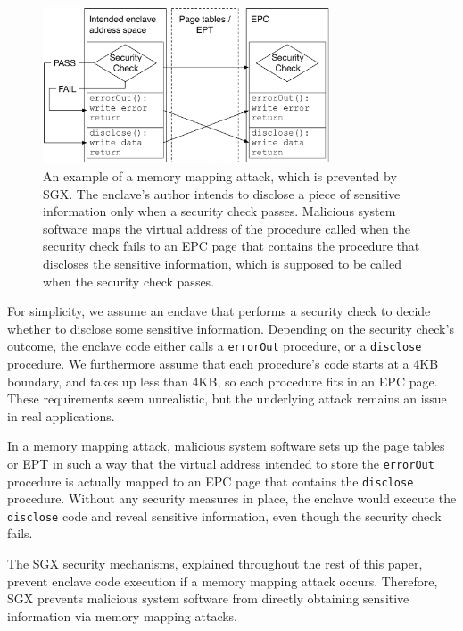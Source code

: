 \begin{figure}[hbt]
  \centering
  \includegraphics[width=85mm]{figures/sgx_mapping_attack.pdf}
  \caption{
    An example of a memory mapping attack, which is prevented by SGX. The
    enclave's author intends to disclose a piece of sensitive information only
    when a security check passes. Malicious system software maps the virtual
    address of the procedure called when the security check fails to an EPC
    page that contains the procedure that discloses the sensitive information,
    which is supposed to be called when the security check passes.
  }
  \label{fig:sgx_mapping_attack}
\end{figure}

For simplicity, we assume an enclave that performs a security check to decide
whether to disclose some sensitive information. Depending on the security
check's outcome, the enclave code either calls a \texttt{errorOut} procedure,
or a \texttt{disclose} procedure. We furthermore assume that each procedure's
code starts at a 4KB boundary, and takes up less than 4KB, so each procedure
fits in an EPC page. These requirements seem unrealistic, but the underlying
attack remains an issue in real applications.

In a memory mapping attack, malicious system software sets up the page tables
or EPT in such a way that the virtual address intended to store the
\texttt{errorOut} procedure is actually mapped to an EPC page that contains the
\texttt{disclose} procedure. Without any security measures in place, the
enclave would execute the \texttt{disclose} code and reveal sensitive
information, even though the security check fails.

The SGX security mechanisms, explained throughout the rest of this paper,
prevent enclave code execution if a memory mapping attack occurs. Therefore,
SGX prevents malicious system software from directly obtaining sensitive
information via memory mapping attacks.
